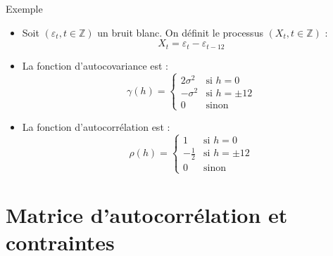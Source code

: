 \documentclass[11pt,aspectratio=169]{beamer}
\newcommand{\Z}{\mathbb{Z}}
\begin{document}
\begin{frame}{Exemple}

\begin{itemize}

\item Soit $(\varepsilon_t, t \in \Z)$ un bruit blanc. On définit le processus $(X_t, t \in \Z)$ :
  \[
  X_t = \varepsilon_t - \varepsilon_{t-12}
  \]\newline

\item La fonction d'autocovariance est :
  \[
  \gamma(h) = \begin{cases}
  2\sigma^2 & \text{si } h = 0 \\
  -\sigma^2 & \text{si } h = \pm 12 \\
  0 & \text{sinon}
  \end{cases}
  \]\newline

\item La fonction d'autocorrélation est :
  \[
  \rho(h) = \begin{cases}
  1 & \text{si } h = 0 \\
  -\frac{1}{2} & \text{si } h = \pm 12 \\
  0 & \text{sinon}
  \end{cases}
  \]

\end{itemize}

\end{frame}

\section{Matrice d'autocorrélation et contraintes}
\end{document}
